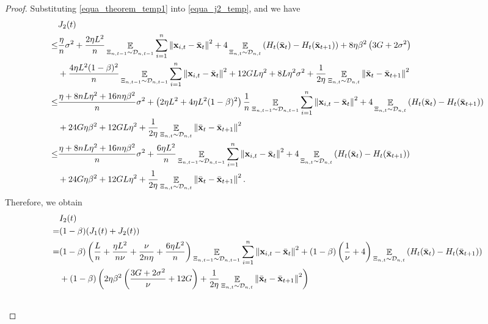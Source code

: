 \documentclass{article}
\begin{document}
\begin{proof}
Substituting \eqref{equa_theorem_temp1} into \eqref{equa_j2_temp}, and we have
\begin{align}
\nonumber
& J_2(t) \\ \nonumber 
\le & \frac{\eta}{n} \sigma^2 + \frac{2\eta L^2}{n}\mathop{\mathbb{E}}_{ \Xi_{n,t-1} \sim \mathcal{D}_{n,t-1} }\sum_{i=1}^n \left\lVert{\bf x}_{i,t} - \bar{{\bf x}}_t \right\rVert^2 + 4\mathop{\mathbb{E}}_{ \Xi_{n,t} \sim \mathcal{D}_{n,t} } \left( H_t(\bar{{\bf x}}_t) - H_t(\bar{{\bf x}}_{t+1}) \right) + 8\eta \beta^2 \left(  3G + 2\sigma^2 \right)   \\ \nonumber
& + \frac{4\eta L^2 (1-\beta)^2}{n}\mathop{\mathbb{E}}_{ \Xi_{n,t-1} \sim \mathcal{D}_{n,t-1} }\sum_{i=1}^n \left\lVert{\bf x}_{i,t} - \bar{{\bf x}}_t\right\rVert^2 + 12GL\eta^2 + 8L\eta^2 \sigma^2  + \frac{1}{2\eta} \mathop{\mathbb{E}}_{ \Xi_{n,t} \sim \mathcal{D}_{n,t} } \left\lVert \bar{{\bf x}}_t - \bar{{\bf x}}_{t+1}\right\rVert^2 \\ \nonumber
\le & \frac{\eta + 8nL\eta^2 + 16n\eta\beta^2}{n} \sigma^2 + \left(  2\eta L^2 + 4\eta L^2(1-\beta)^2  \right)\frac{1}{n}\mathop{\mathbb{E}}_{ \Xi_{n,t-1} \sim \mathcal{D}_{n,t-1} }\sum_{i=1}^n \left\lVert{\bf x}_{i,t} - \bar{{\bf x}}_t\right\rVert^2 + 4\mathop{\mathbb{E}}_{ \Xi_{n,t} \sim \mathcal{D}_{n,t} } \left( H_t(\bar{{\bf x}}_t) - H_t(\bar{{\bf x}}_{t+1}) \right) \\ \nonumber 
& + 24G\eta \beta^2 + 12GL\eta^2 + \frac{1}{2\eta} \mathop{\mathbb{E}}_{ \Xi_{n,t} \sim \mathcal{D}_{n,t} }\left\lVert \bar{{\bf x}}_t - \bar{{\bf x}}_{t+1}\right\rVert^2 \\ \nonumber
\le & \frac{\eta + 8nL\eta^2 + 16n\eta\beta^2}{n} \sigma^2 + \frac{6\eta L^2}{n}\mathop{\mathbb{E}}_{ \Xi_{n,t-1} \sim \mathcal{D}_{n,t-1} }\sum_{i=1}^n \left\lVert{\bf x}_{i,t} - \bar{{\bf x}}_t\right\rVert^2 + 4\mathop{\mathbb{E}}_{ \Xi_{n,t} \sim \mathcal{D}_{n,t} } \left( H_t(\bar{{\bf x}}_t) - H_t(\bar{{\bf x}}_{t+1}) \right) \\ \nonumber 
& + 24G\eta \beta^2 + 12GL\eta^2 + \frac{1}{2\eta} \mathop{\mathbb{E}}_{ \Xi_{n,t} \sim \mathcal{D}_{n,t} }\left\lVert \bar{{\bf x}}_t - \bar{{\bf x}}_{t+1}\right\rVert^2.
\end{align} Therefore, we obtain
\begin{align}
\nonumber
& I_2(t) \\ \nonumber 
= & (1-\beta)(J_1(t) + J_2(t)) \\ \nonumber
= &  (1-\beta)\lrincir{ \frac{L}{n} + \frac{\eta L^2}{n\nu} + \frac{\nu}{2n\eta} + \frac{6\eta L^2}{n} }\EE_{ \Xi_{n,t-1} \sim \Dcal_{n,t-1} }\sum_{i=1}^n\lrnorm{\x_{i,t} - \bar{\x}_t }^2  + (1-\beta)\lrincir{\frac{1}{\nu} + 4} \EE_{ \Xi_{n,t} \sim \Dcal_{n,t} } \lrincir{H_t(\bar{\x}_t) - H_t(\bar{\x}_{t+1})}\\ \nonumber 
&+ (1-\beta) \lrincir{ 2\eta\beta^2\lrincir{\frac{3G + 2\sigma^2}{\nu} + 12G} +  \frac{1}{2\eta} \EE_{ \Xi_{n,t} \sim \Dcal_{n,t} }\lrnorm{ \bar{\x}_t - \bar{\x}_{t+1}}^2 } \\ \nonumber 

\end{align}
\end{proof}
\end{document}
